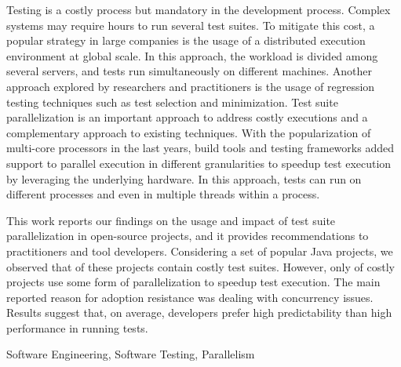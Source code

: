Testing is a costly process but mandatory in the development process.
Complex systems may require hours to run several test suites.
To mitigate this cost, a popular strategy in large companies is the usage of a
distributed execution environment at global scale.
In this approach, the workload is divided among several servers, and tests
run simultaneously on different machines.
Another approach explored by researchers and practitioners is the usage of
regression testing techniques such as test selection and minimization.
Test suite parallelization is an important approach to address costly
executions and a complementary approach to existing techniques.
With the popularization of multi-core processors in the last years, build tools
and testing frameworks added support to parallel execution in different
granularities to speedup test execution by leveraging the underlying hardware.
In this approach, tests can run on different processes and even in multiple
threads within a process.

This work reports our findings on the usage and impact of test suite
parallelization in open-source projects, and it provides recommendations to
practitioners and tool developers.
Considering a set of \numSubjs{} popular Java projects, we observed that
\percentMedLongRunning{} of these projects contain costly test suites.
However, only \percentParallelUpdated{} of costly projects use some form of
parallelization to speedup test execution.
The main reported reason for adoption resistance was dealing with concurrency
issues.
Results suggest that, on average, developers prefer high predictability than
high performance in running tests.

\begin{keywords}
Software Engineering, Software Testing, Parallelism
\end{keywords}

